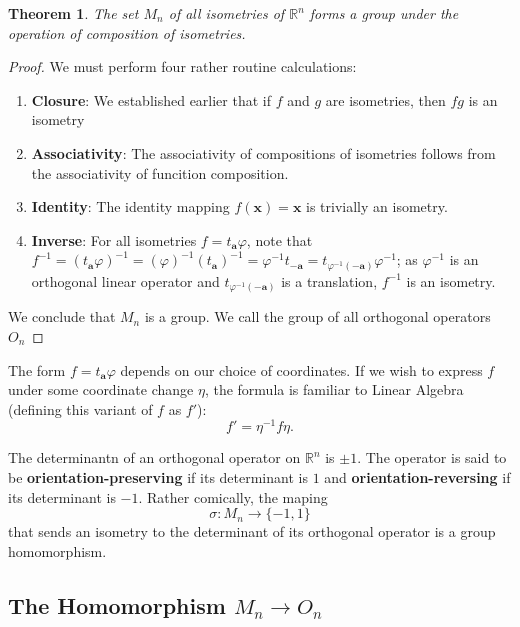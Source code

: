 \documentclass[11pt]{article}
\renewcommand{\vec}[1]{\mathbf{#1}}
\newtheorem{theorem}{Theorem}
\begin{document}
\begin{adjustwidth}{1cm}{}
	\begin{theorem}
		The set $M_{n}$ of all isometries of $\mathbb{R}^{n}$ forms a group under the operation of composition of isometries.
	\end{theorem}
	\begin{proof}
		We must perform four rather routine calculations:
		\begin{enumerate}
			\item \textbf{Closure}: We established earlier that if $f$ and $g$ are isometries, then $fg$ is an isometry
			\item \textbf{Associativity}: The associativity of compositions of isometries follows from the associativity of funcition composition.
			\item \textbf{Identity}: The identity mapping $f(\vec{x}) = \vec{x}$ is trivially an isometry.
			\item \textbf{Inverse}: For all isometries $f = t_{\vec{a}} \varphi$, note that $f^{-1} = (t_{\vec{a}} \varphi)^{-1} = (\varphi)^{-1}(t_{\vec{a}})^{-1} = \varphi^{-1} t_{-\vec{a}} = t_{\varphi^{-1}(-\vec{a})} \varphi^{-1}$; as $\varphi^{-1}$ is an orthogonal linear operator and $t_{\varphi^{-1}(-\vec{a})}$ is a translation, $f^{-1}$ is an isometry.
		\end{enumerate}
		We conclude that $M_{n}$ is a group. We call the group of all orthogonal operators $O_{n}$
	\end{proof}
\end{adjustwidth}

The form $f = t_{\vec{a}} \varphi$ depends on our choice of coordinates. If we wish to express $f$ under some coordinate change $\eta$, the formula is familiar to Linear Algebra (defining this variant of $f$ as $f'$):
\[
	f' = \eta^{-1} f \eta.
\]

The determinantn of an orthogonal operator on $\mathbb{R}^{n}$ is $\pm 1$. The operator is said to be \textbf{orientation-preserving} if its determinant is $1$ and \textbf{orientation-reversing} if its determinant is $-1$. Rather comically, the maping 
\[
	\sigma : M_{n} \to \{ -1, 1 \}
\]
that sends an isometry to the determinant of its orthogonal operator is a group homomorphism.


\subsection{The Homomorphism \texorpdfstring{$M_{n} \to O_{n}$}{from Mn to On}}
\end{document}
